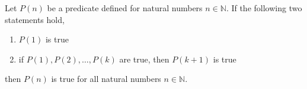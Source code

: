 \documentclass[twoside]{report}
\begin{document}
\vspace{\baselineskip}
\begin{theorem}
	Let $P(n)$ be a predicate defined for natural numbers $n \in \mathbb{N}$. If the following two statements hold,
	
	\vspace{\baselineskip}
	\begin{enumerate}
		\item $P(1)$ is true
		\item if $P(1), P(2), \dots, P(k)$ are true, then $P(k + 1)$ is true
	\end{enumerate}
	\vspace{\baselineskip}

	then $P(n)$ is true for all natural numbers $n \in \mathbb{N}$.
\end{theorem}
\end{document}
